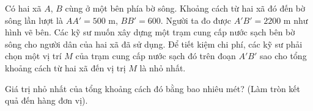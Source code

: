 \begin{ex}%
Có hai xã $A$, $B$ cùng ở một bên phía bờ sông. Khoảng cách từ hai xã đó đến bờ sông lần lượt là $AA'=500$ m, $BB'=600$. Người ta đo được $A'B'=2200$ m như hình vẽ bên. Các kỹ sư muốn xây dựng một trạm cung cấp nước sạch bên bờ sông cho người dân của hai xã đã sử dụng. Để tiết kiệm chi phí, các kỹ sư phải chọn một vị trí $M$ của trạm cung cấp nước sạch đó trên đoạn $A'B'$ sao cho tổng khoảng cách từ hai xã đến vị trị $M$ là nhỏ nhất.
\begin{center}
\end{center}
Giá trị nhỏ nhất của tổng khoảng cách đó bằng bao nhiêu mét? (Làm tròn kết quả đến hàng đơn vị).


\end{ex}
